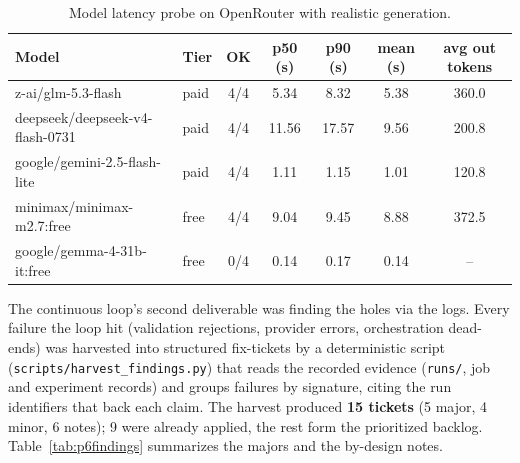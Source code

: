 \begin{table}[H]
\centering\small
\caption{Model latency probe on OpenRouter with realistic generation.}
\label{tab:latency-latency-probe-openrouter-realistic}
\begin{tabular}{llccccc}
\toprule
Model & Tier & OK & p50 (s) & p90 (s) & mean (s) & avg out tokens \\
\midrule
z-ai/glm-5.3-flash               & paid & 4/4 & 5.34  & 8.32  & 5.38 & 360.0 \\
deepseek/deepseek-v4-flash-0731  & paid & 4/4 & 11.56 & 17.57 & 9.56 & 200.8 \\
google/gemini-2.5-flash-lite     & paid & 4/4 & 1.11  & 1.15  & 1.01 & 120.8 \\
minimax/minimax-m2.7:free        & free & 4/4 & 9.04  & 9.45  & 8.88 & 372.5 \\
google/gemma-4-31b-it:free       & free & 0/4 & 0.14  & 0.17  & 0.14 & -- \\
\bottomrule
\end{tabular}
\end{table}


The continuous loop's second deliverable was finding the holes via the logs. Every failure the loop hit (validation rejections, provider errors, orchestration dead-ends) was harvested into structured fix-tickets by a deterministic script (\texttt{scripts/harvest\_findings.py}) that reads the recorded evidence (\texttt{runs/}, job and experiment records) and groups failures by signature, citing the run identifiers that back each claim. The harvest produced \textbf{15 tickets} (5 major, 4 minor, 6 notes); 9 were already applied, the rest form the prioritized backlog. Table~\ref{tab:p6findings} summarizes the majors and the by-design notes.

